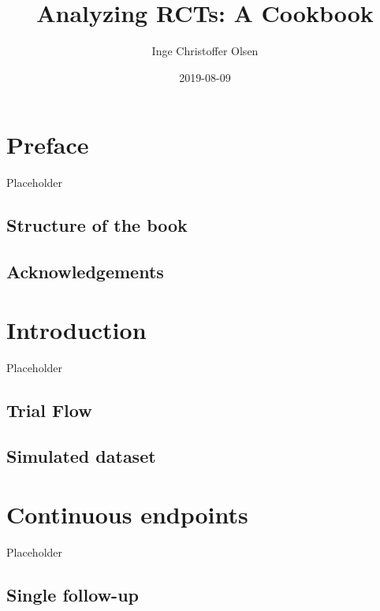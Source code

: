 \documentclass[]{book}
\title{Analyzing RCTs: A Cookbook}
\author{Inge Christoffer Olsen}
\date{2019-08-09}
\begin{document}
\maketitle

{
\setcounter{tocdepth}{1}
\tableofcontents
}
\hypertarget{preface}{%
\chapter{Preface}\label{preface}}

Placeholder

\hypertarget{structure-of-the-book}{%
\section{Structure of the book}\label{structure-of-the-book}}

\hypertarget{acknowledgements}{%
\section{Acknowledgements}\label{acknowledgements}}

\hypertarget{intro}{%
\chapter{Introduction}\label{intro}}

Placeholder

\hypertarget{trial-flow}{%
\section{Trial Flow}\label{trial-flow}}

\hypertarget{simulated-dataset}{%
\section{Simulated dataset}\label{simulated-dataset}}

\hypertarget{continuous-endpoints}{%
\chapter{Continuous endpoints}\label{continuous-endpoints}}

Placeholder

\hypertarget{single-follow-up}{%
\section{Single follow-up}\label{single-follow-up}}
\end{document}
